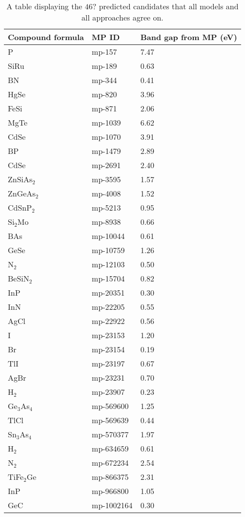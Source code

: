 \begin{center}
\begin{longtable}{M{3.5cm} M{6.5cm} M{2.0cm}}
\caption{A table displaying the $46$? predicted candidates that all models and all approaches agree on.}
\label{tab:03-probability-candidates}  
\hline
Compound formula & MP ID & Band gap from MP (eV) \\
\hline
  P & mp-157 & 7.47\\
  SiRu & mp-189 & 0.63\\
  BN & mp-344 & 0.41\\
  HgSe & mp-820 & 3.96\\
  FeSi & mp-871 & 2.06\\
  MgTe & mp-1039 & 6.62\\
  CdSe & mp-1070 & 3.91\\
  BP & mp-1479 & 2.89\\
  CdSe & mp-2691 & 2.40\\
  ZnSiAs$_2$ & mp-3595 & 1.57\\
  ZnGeAs$_2$ & mp-4008 & 1.52\\
  CdSnP$_2$ & mp-5213 & 0.95\\
  Si$_2$Mo & mp-8938 & 0.66\\
  BAs & mp-10044 & 0.61\\
  GeSe & mp-10759 & 1.26\\
  N$_2$ & mp-12103 & 0.50\\
  BeSiN$_2$ & mp-15704 & 0.82\\
  InP & mp-20351 & 0.30\\
  InN & mp-22205 & 0.55\\
  AgCl & mp-22922 & 0.56\\
  I & mp-23153 & 1.20\\
  Br & mp-23154 & 0.19\\
  TlI & mp-23197 & 0.67\\
  AgBr & mp-23231 & 0.70\\
  H$_2$ & mp-23907 & 0.23\\
  Ge$_3$As$_4$ & mp-569600 & 1.25\\
  TlCl & mp-569639 & 0.44\\
  Sn$_3$As$_4$ & mp-570377 & 1.97\\
  H$_2$ & mp-634659 & 0.61\\
  N$_2$ & mp-672234 & 2.54\\
  TiFe$_2$Ge & mp-866375 & 2.31\\
  InP & mp-966800 & 1.05\\
  GeC & mp-1002164 & 0.30\\

\end{longtable}
\end{center}
